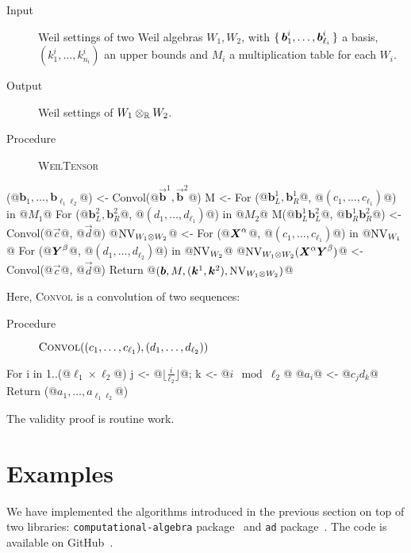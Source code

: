 \begin{algorithm}[WeilTensor]\label{alg:weil-tensor}
\hfill\vspace{-.25em}
\begin{description}
  \item[Input] Weil settings of two Weil algebras $W_1, W_2$,
  with $\set{\boldsymbol{b}_1^i, \dots, \boldsymbol{b}_{\ell_i}^i}$ a basis,
  $(k^i_1, \dots, k^i_{n_i})$ an upper bounds and $M_i$ a multiplication table for each $W_i$.
  \item[Output] Weil settings of $W_1 \otimes_{\mathbb{R}} W_2$.
  \item[Procedure] {\upshape \textsc{WeilTensor}}
\end{description}
\begin{alg}
(@$\boldsymbol{b}_1, \dots, \boldsymbol{b}_{\ell_1 \ell_2}$@) <- Convol(@$\vec{\boldsymbol{b}}^1, \vec{\boldsymbol{b}}^2$@)
M <- {}
For ({@$\boldsymbol{b}^1_L, \boldsymbol{b}^1_R$@}, @$(c_1,\dots,c_{\ell_1})$@) in @$M_1$@
  For ({@$\boldsymbol{b}^2_L, \boldsymbol{b}^2_R$@}, @$(d_1,\dots,d_{\ell_1})$@) in @$M_2$@
    M({@$\boldsymbol{b}^1_L \boldsymbol{b}^2_L$@, @$\boldsymbol{b}^1_R \boldsymbol{b}^2_R$@}) <- Convol(@$\vec{c}$@, @$\vec{d}$@)
@$\operatorname{NV}_{W_1 \otimes W_2}$@ <- {}
For (@$\boldsymbol{X}^\alpha$@, @$(c_1, \dots, c_{\ell_1})$@) in @$\operatorname{NV}_{W_1}$@
  For (@$\boldsymbol{Y}^\beta$@, @$(d_1,\dots,d_{\ell_2})$@) in @$\operatorname{NV}_{W_2}$@
    @$\operatorname{NV}_{W_1 \otimes W_2}(\boldsymbol{X}^\alpha\boldsymbol{Y}^\beta)$@ <- Convol(@$\vec{c}$@, @$\vec{d}$@)
Return @$(\boldsymbol{b}, M, (\vec{k}^1, \vec{k}^2), \NonVan_{W_1 \otimes W_2})$@
\end{alg}

Here, {\upshape \textsc{Convol}} is a convolution of two sequences:
\begin{description}
  \item[Procedure] $\mathop{\text{\upshape\scshape Convol}}((c_1, \dots, c_{\ell_1}), (d_1, \dots, d_{\ell_2}))$
\end{description}
\begin{alg}
For i in 1..(@$\ell_1 \times \ell_2$@)
  j <- @$\lfloor \frac{i}{\ell_2} \rfloor$@; k <- @$i \mod{\ell_2}$@
  @$a_i$@ <- @$c_j d_k$@
Return (@$a_1, \dots, a_{\ell_1 \ell_2}$@)
\end{alg}
\end{algorithm}

The validity proof is routine work.

\section{Examples}\label{sec:examples}
We have implemented the algorithms introduced in the previous section on top of two libraries: \texttt{computational-algebra} package~\cite{ISHII:2018ek,computational-algebra} and \texttt{ad} package~\cite{Kmett:2010aa}.
The code is available on GitHub~\cite{Ishii:2020aa}.

